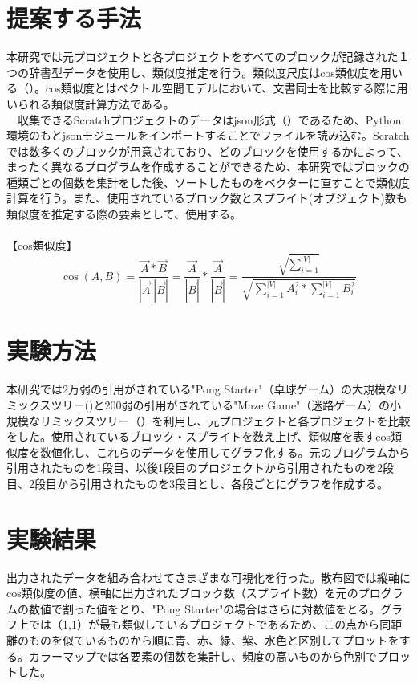 \documentclass[twocolumn,9pt,a4paper]{jsarticle}
\begin{document}
\section{提案する手法}
本研究では元プロジェクトと各プロジェクトをすべてのブロックが記録された１つの辞書型データを使用し、類似度推定を行う。類似度尺度はcos類似度を用いる（\cite{cos}）。cos類似度とはベクトル空間モデルにおいて、文書同士を比較する際に用いられる類似度計算方法である。
\\
　収集できるScratchプロジェクトのデータはjson形式（\cite{json_py}）であるため、Python環境のもとjsonモジュールをインポートすることでファイルを読み込む。Scratchでは数多くのブロックが用意されており、どのブロックを使用するかによって、まったく異なるプログラムを作成することができるため、本研究ではブロックの種類ごとの個数を集計をした後、ソートしたものをベクターに直すことで類似度計算を行う。また、使用されているブロック数とスプライト(オブジェクト)数も類似度を推定する際の要素として、使用する。
\\
\\【cos類似度】
\begin{equation}
\cos(A,B) = \frac{\vec{A} \ast\vec{B}} {|\vec{A}||\vec{B}|}  = \frac{\vec{A}}{|\vec{B}|}\ast\frac{\vec{A}}{|\vec{B}|} = \frac{\sqrt {\sum_{i=1}^{|V|}}}{\sqrt{\sum_{i=1}^{|V|}A_i^2\ast\sum_{i=1}^{|V|}B_i^2}}
\end{equation}


\section{実験方法}
本研究では2万弱の引用がされている"Pong Starter"（卓球ゲーム）の大規模なリミックスツリー(\cite{pongret})と200弱の引用がされている"Maze Game"（迷路ゲーム）の小規模なリミックスツリー（\cite{mazeret}）を利用し、元プロジェクトと各プロジェクトを比較をした。使用されているブロック・スプライトを数え上げ、類似度を表すcos類似度を数値化し、これらのデータを使用してグラフ化する。元のプログラムから引用されたものを1段目、以後1段目のプロジェクトから引用されたものを2段目、2段目から引用されたものを3段目とし、各段ごとにグラフを作成する。

\section{実験結果}
出力されたデータを組み合わせてさまざまな可視化を行った。散布図では縦軸にcos類似度の値、横軸に出力されたブロック数（スプライト数）を元のプログラムの数値で割った値をとり、"Pong Starter"の場合はさらに対数値をとる。グラフ上では（1,1）が最も類似しているプロジェクトであるため、この点から同距離のものを似ているものから順に青、赤、緑、紫、水色と区別してプロットをする。カラーマップでは各要素の個数を集計し、頻度の高いものから色別でプロットした。
\\
\end{document}

